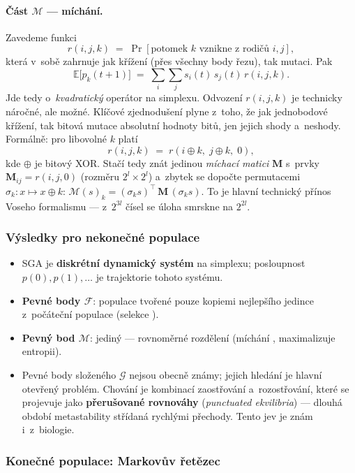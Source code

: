 \documentclass[11pt,a4paper]{article}
\theoremstyle{definition}
\begin{document}
\paragraph{Část $\mathcal{M}$ --- míchání.} Zavedeme funkci
\[
r(i,j,k) \;=\; \Pr[\text{potomek } k \text{ vznikne z~rodičů } i, j],
\]
která v~sobě zahrnuje jak křížení (přes všechny body řezu), tak mutaci.
Pak
\[
\mathbb{E}\big[p_k(t+1)\big] \;=\; \sum_{i}\sum_{j} s_i(t)\, s_j(t)\, r(i,j,k).
\]
Jde tedy o~\emph{kvadratický} operátor na simplexu. Odvození $r(i,j,k)$ je
technicky náročné, ale možné. Klíčové zjednodušení plyne z~toho, že jak
jednobodové křížení, tak bitová mutace  absolutní hodnoty bitů,
jen jejich shody a~neshody. Formálně: pro libovolné $k$ platí
\[
r(i,j,k) \;=\; r(i \oplus k,\; j \oplus k,\; 0),
\]
kde $\oplus$ je bitový XOR. Stačí tedy znát jedinou \emph{míchací matici}
$\mathbf{M}$ s~prvky $\mathbf{M}_{ij} = r(i,j,0)$ (rozměru $2^l \times 2^l$)
a~zbytek se dopočte permutacemi $\sigma_k : x \mapsto x \oplus k$:
$\mathcal{M}(s)_k = (\sigma_k s)^{\!\top}\, \mathbf{M}\, (\sigma_k s)$.
To je hlavní technický přínos Voseho formalismu --- z~$2^{3l}$ čísel se úloha
smrskne na $2^{2l}$.

\subsubsection{Výsledky pro nekonečné populace}

\begin{itemize}
\item SGA je \textbf{diskrétní dynamický systém} na simplexu; posloupnost
  $p(0), p(1), \dots$ je trajektorie tohoto systému.
\item \textbf{Pevné body $\mathcal{F}$}: populace tvořené pouze kopiemi
  nejlepšího jedince z~počáteční populace (selekce ).
\item \textbf{Pevný bod $\mathcal{M}$}: jediný --- rovnoměrné rozdělení
  (míchání , maximalizuje entropii).
\item Pevné body složeného $\mathcal{G}$ nejsou obecně známy; jejich hledání
  je hlavní otevřený problém. Chování je kombinací zaostřování a~rozostřování,
  které se projevuje jako \textbf{přerušované rovnováhy}
  (\emph{punctuated ekvilibria}) --- dlouhá období metastability střídaná
  rychlými přechody. Tento jev je znám i~z~biologie.
\end{itemize}

\subsubsection{Konečné populace: Markovův řetězec}
\end{document}

